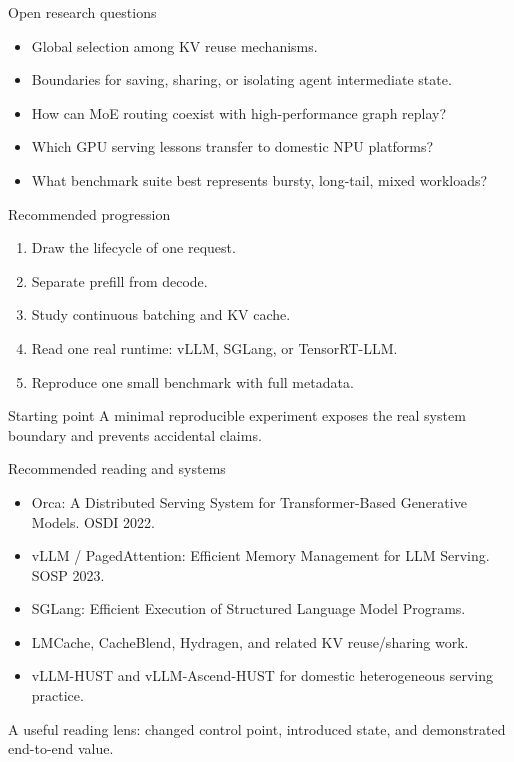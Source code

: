 \documentclass[aspectratio=169,11pt]{beamer}
\newcommand{\smallnote}[1]{\textcolor{HUSTGray}{\footnotesize #1}}
\begin{document}
\begin{frame}{Open research questions}
  \begin{itemize}
    \item Global selection among KV reuse mechanisms.
    \item Boundaries for saving, sharing, or isolating agent intermediate state.
    \item How can MoE routing coexist with high-performance graph replay?
    \item Which GPU serving lessons transfer to domestic NPU platforms?
    \item What benchmark suite best represents bursty, long-tail, mixed workloads?
  \end{itemize}
\end{frame}

\begin{frame}{Recommended progression}
  \begin{enumerate}
    \item Draw the lifecycle of one request.
    \item Separate prefill from decode.
    \item Study continuous batching and KV cache.
    \item Read one real runtime: vLLM, SGLang, or TensorRT-LLM.
    \item Reproduce one small benchmark with full metadata.
  \end{enumerate}
  \vspace{0.3cm}
  \begin{block}{Starting point}
    A minimal reproducible experiment exposes the real system boundary and prevents accidental claims.
  \end{block}
\end{frame}

\begin{frame}{Recommended reading and systems}
  \begin{itemize}
    \item Orca: A Distributed Serving System for Transformer-Based Generative Models. OSDI 2022.
    \item vLLM / PagedAttention: Efficient Memory Management for LLM Serving. SOSP 2023.
    \item SGLang: Efficient Execution of Structured Language Model Programs.
    \item LMCache, CacheBlend, Hydragen, and related KV reuse/sharing work.
    \item vLLM-HUST and vLLM-Ascend-HUST for domestic heterogeneous serving practice.
  \end{itemize}
  \vspace{0.2cm}
  \smallnote{A useful reading lens: changed control point, introduced state, and demonstrated end-to-end value.}
\end{frame}
\end{document}

